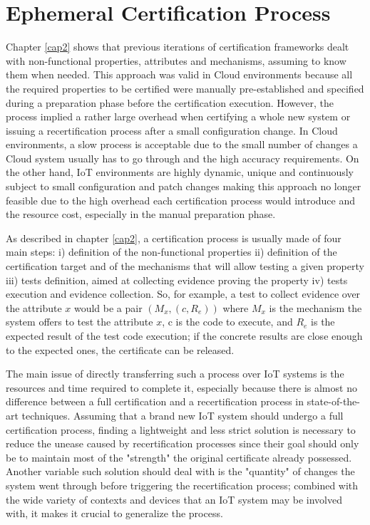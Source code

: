\section{Ephemeral Certification Process}
Chapter \ref{cap2} shows that previous iterations of certification frameworks dealt with non-functional properties, attributes and mechanisms, assuming to know them when needed. This approach was valid in Cloud environments because all the required properties to be certified were manually pre-established and specified during a preparation phase before the certification execution. However, the process implied a rather large overhead when certifying a whole new system or issuing a recertification process after a small configuration change. In Cloud environments, a slow process is acceptable due to the small number of changes a Cloud system usually has to go through and the high accuracy requirements. On the other hand, IoT environments are highly dynamic, unique and continuously subject to small configuration and patch changes making this approach no longer feasible due to the high overhead each certification process would introduce and the resource cost, especially in the manual preparation phase.

As described in chapter \ref{cap2}, a certification process is usually made of four main steps: i) definition of the non-functional properties ii) definition of the certification target and of the mechanisms that will allow testing a given property iii) tests definition, aimed at collecting evidence proving the property iv) tests execution and evidence collection. So, for example, a test to collect evidence over the attribute \(x\) would be a pair \( (M_x, (c, R_e) ) \) where \(M_x\) is the mechanism the system offers to test the attribute \(x\), c is the code to execute, and \(R_e\) is the expected result of the test code execution; if the concrete results are close enough to the expected ones, the certificate can be released.

The main issue of directly transferring such a process over IoT systems is the resources and time required to complete it, especially because there is almost no difference between a full certification and a recertification process in state-of-the-art techniques. Assuming that a brand new IoT system should undergo a full certification process, finding a lightweight and less strict solution is necessary to reduce the unease caused by recertification processes since their goal should only be to maintain most of the "strength" the original certificate already possessed. Another variable such solution should deal with is the "quantity" of changes the system went through before triggering the recertification process; combined with the wide variety of contexts and devices that an IoT system may be involved with, it makes it crucial to generalize the process.

